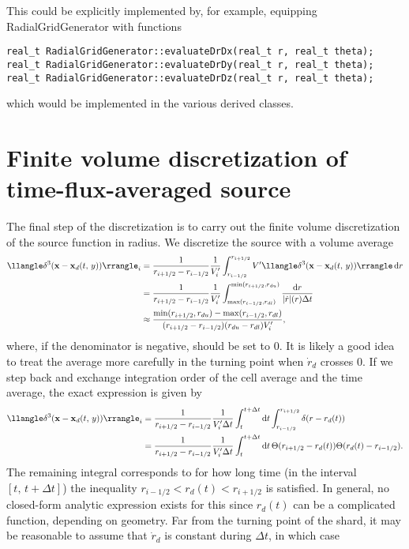 \documentclass[11pt,a4paper]{article}
\newcommand{\rd}{\ensuremath{\mathrm{d}}}
\renewcommand{\b}[1]{\ensuremath{ {\bf #1 } }}
\begin{document}
This could be explicitly implemented by, for example, equipping RadialGridGenerator with functions
\begin{verbatim}
real_t RadialGridGenerator::evaluateDrDx(real_t r, real_t theta);
real_t RadialGridGenerator::evaluateDrDy(real_t r, real_t theta);
real_t RadialGridGenerator::evaluateDrDz(real_t r, real_t theta);
\end{verbatim}
which would be implemented in the various derived classes. 

\section*{Finite volume discretization of time-flux-averaged source}
The final step of the discretization is to carry out the finite volume discretization of the source function in radius. We discretize the source  with a volume average
\begin{align}
\llangle\delta^3( \b{x} - \b{x}_d(t,\,y)) \rrangle_i &= \frac{1}{r_{i+1/2} - r_{i-1/2}} \frac{1}{V'_i}\int_{r_{i-1/2}}^{r_{i+1/2}}V'\llangle\delta^3( \b{x} - \b{x}_d(t,\,y)) \rrangle  \, \rd r \nonumber \\
&= \frac{1}{r_{i+1/2} - r_{i-1/2}} \frac{1}{V'_i}\int_{\text{max}(r_{i-1/2},r_{dl})}^{\text{min}(r_{i+1/2},r_{du})}\frac{\rd r}{|\dot{r}|(r) \Delta t } \nonumber \\
&\approx \frac{\text{min}(r_{i+1/2},r_{du})-\text{max}(r_{i-1/2},r_{dl})}{(r_{i+1/2} - r_{i-1/2})(r_{du}-r_{dl})V'_i},
\end{align}
where, if the denominator is negative, should be set to 0.
It is likely a good idea to treat the average more carefully in the turning point when $\dot{r}_d$ crosses 0. If we step back and exchange integration order of the cell average and the time average, the exact expression is given by
\begin{align}
\llangle\delta^3( \b{x} - \b{x}_d(t,\,y)) \rrangle_i &= \frac{1}{r_{i+1/2} - r_{i-1/2}} \frac{1}{V'_i\Delta t}\int_t^{t+\Delta t}\rd t \int_{r_{i-1/2}}^{r_{i+1/2}}\delta(r-r_d(t)) \nonumber \\
&=\frac{1}{r_{i+1/2} - r_{i-1/2}} \frac{1}{V'_i\Delta t}\int_t^{t+\Delta t}\rd t \, \Theta(r_{i+1/2} - r_d(t)) \Theta(r_d(t)-r_{i-1/2}).
\end{align}
The remaining integral corresponds to for how long time (in the interval $[t,\,t+\Delta t]$) the inequality $r_{i-1/2} < r_d(t) < r_{i+1/2}$ is satisfied. In general, no closed-form analytic expression exists for this since $r_d(t)$ can be a complicated function, depending on geometry. Far from the turning point of the shard, it may be reasonable to assume that $\dot{r}_d$ is constant during $\Delta t$, in which case 
\end{document}
